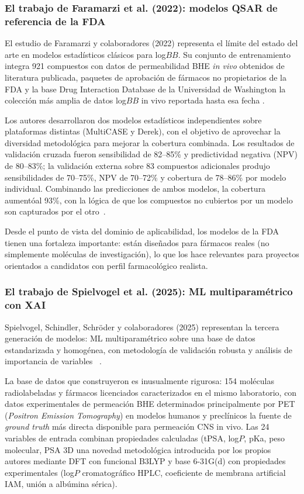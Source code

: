 \subsubsection{El trabajo de Faramarzi et al. (2022): modelos QSAR
  de referencia de la FDA}
 
El estudio de Faramarzi y colaboradores (2022) representa el límite del estado del arte en modelos estadísticos clásicos para log$BB$. Su conjunto de entrenamiento integra 921 compuestos con datos de permeabilidad BHE \textit{in vivo} obtenidos de literatura publicada, paquetes de aprobación de fármacos no propietarios de la FDA y la base Drug Interaction Database de la Universidad de Washington la colección más amplia de datos log$BB$ in vivo reportada hasta esa fecha \cite{faramarzi_development_2022}.
 
Los autores desarrollaron dos modelos estadísticos independientes sobre plataformas distintas (MultiCASE y Derek), con el objetivo de aprovechar la diversidad metodológica para mejorar la cobertura combinada. Los resultados de validación cruzada fueron sensibilidad de 82–85\% y predictividad negativa (NPV) de 80–83\%; la validación externa sobre 83 compuestos adicionales produjo sensibilidades de 70–75\%, NPV de 70–72\% y cobertura de 78–86\% por modelo individual. Combinando las predicciones de ambos modelos, la cobertura aumentóal 93\%, con la lógica de que los compuestos no cubiertos por un modelo son capturados por el otro~\cite{faramarzi_development_2022}.
 
Desde el punto de vista del dominio de aplicabilidad, los modelos de la FDA tienen una fortaleza importante: están diseñados para fármacos reales (no simplemente moléculas de investigación), lo que los hace relevantes para proyectos orientados a candidatos con perfil farmacológico realista.
 
\subsubsection{El trabajo de Spielvogel et al. (2025): ML multiparamétrico con XAI}
 
Spielvogel, Schindler, Schröder y colaboradores (2025) representan la tercera generación de modelos: ML multiparamétrico sobre una base de datos estandarizada y homogénea, con metodología de validación robusta y análisis de importancia de variables ~\cite{spielvogel_enhancing_2025a}.
 
La base de datos que construyeron es inusualmente rigurosa: 154 moléculas radiolabeladas y fármacos licenciados caracterizados en el mismo laboratorio, con datos experimentales de permeación BHE determinados principalmente por PET (\textit{Positron Emission Tomography}) en modelos humanos y preclínicos la fuente de \textit{ground truth} más directa disponible para permeación CNS in vivo. Las 24 variables de entrada combinan propiedades calculadas (tPSA, log$P$, pKa, peso molecular, PSA 3D una novedad metodológica introducida por los propios autores mediante DFT con funcional B3LYP y base 6-31G(d) con propiedades experimentales (log$P$ cromatográfico HPLC, coeficiente de membrana artificial IAM, unión a albúmina sérica).
 
